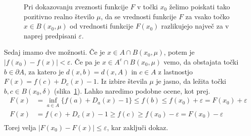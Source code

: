 \documentclass[mat1]{fmfdelo}
\newcommand{\0}{\underline{0}}
\begin{document}
\begin{dokaz}
\begin{figure}[h!]
	\centering
	\caption{Pri dokazovanju zveznosti funkcije $F$ v točki $x_0$ želimo poiskati tako pozitivno realno število $\mu$, da se vrednosti funkcije $F$ za vsako točko $x \in B(x_0, \mu)$ od vrednosti funkcije $F(x_0)$ razlikujejo največ za v naprej predpisani $\varepsilon$.}\label{fig:zveznarazsiritev}
\end{figure}

Sedaj imamo dve možnosti. Če je $x \in A \cap B(x_0, \mu)$, potem je $|f(x_0) - f(x)| < \varepsilon$. Če pa je $x \in A^c \cap B(x_0, \mu)$ vemo, da obstajata točki $b \in \partial A$, za katero je $d(x, b) = d(x, A)$ in $c \in A $ z lastnostjo $F(x) = f(c) + D_c(x) -1$. Iz izbire števila $\mu$ je jasno, da ležita točki $b, c \in B(x_0, \delta)$ (slika~\ref{fig:zveznarazsiritev}). Lahko naredimo podobne ocene, kot prej.
 \begin{equation*} \label{eq1}
\begin{split}
F(x) & = \inf_{a \in A} \{ f(a) + D_a(x) - 1\} \leq f(b) \leq f(x_0) +\varepsilon = F(x_0) +\varepsilon\\
F(x) & = f(c) + D_c(x) -1 \geq f(c) \geq f(x_0) - \varepsilon =  F(x_0) -\varepsilon \\
\end{split}
\end{equation*}
 Torej velja $| F(x_0) - F(x) | \leq \varepsilon$, kar zaključi dokaz.
\end{dokaz}
\end{document}
